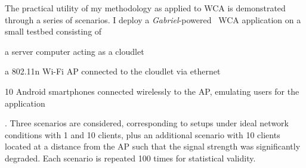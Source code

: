 \medskip
The practical utility of my methodology as applied to \gls{WCA} is demonstrated through a series of scenarios.
I deploy a \emph{Gabriel}-powered~\cite{chen2018application} \gls{WCA} application on a small testbed consisting of
\begin{inlineenum}
    \item a server computer acting as a cloudlet
    \item a 802.11n Wi-Fi \gls{AP} connected to the cloudlet via ethernet
    \item \num{10} Android smartphones connected wirelessly to the \gls{AP}, emulating users for the application
\end{inlineenum}.
Three scenarios are considered, corresponding to setups under ideal network conditions with \num{1} and \num{10} clients, plus an additional scenario with \num{10} clients located at a distance from the \gls{AP} such that the signal strength was significantly degraded.
Each scenario is repeated \num{100} times for statistical validity.

